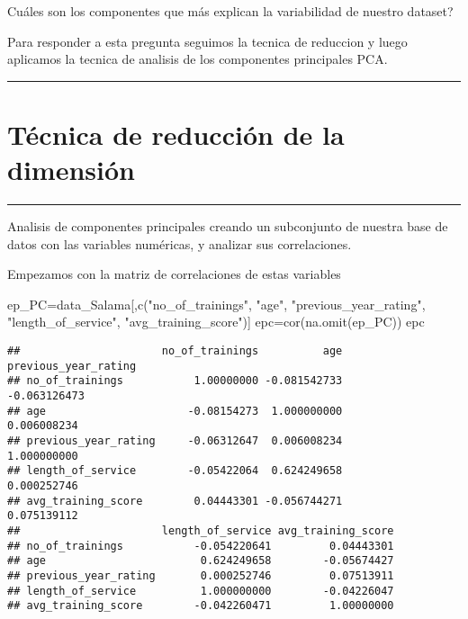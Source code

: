 \documentclass[
]{article}
\newenvironment{Shaded}{\begin{snugshade}}{\end{snugshade}}
\newcommand{\FunctionTok}[1]{\textcolor[rgb]{0.00,0.00,0.00}{#1}}
\newcommand{\NormalTok}[1]{#1}
\newcommand{\OtherTok}[1]{\textcolor[rgb]{0.56,0.35,0.01}{#1}}
\newcommand{\StringTok}[1]{\textcolor[rgb]{0.31,0.60,0.02}{#1}}
\begin{document}
Cuáles son los componentes que más explican la variabilidad de nuestro
dataset?

Para responder a esta pregunta seguimos la tecnica de reduccion y luego
aplicamos la tecnica de analisis de los componentes principales PCA.

\begin{center}\rule{0.5\linewidth}{0.5pt}\end{center}

\hypertarget{tuxe9cnica-de-reducciuxf3n-de-la-dimensiuxf3n}{%
\section{Técnica de reducción de la
dimensión}\label{tuxe9cnica-de-reducciuxf3n-de-la-dimensiuxf3n}}

\begin{center}\rule{0.5\linewidth}{0.5pt}\end{center}

Analisis de componentes principales creando un subconjunto de nuestra
base de datos con las variables numéricas, y analizar sus correlaciones.

Empezamos con la matriz de correlaciones de estas variables

\begin{Shaded}
\begin{Highlighting}[]
\NormalTok{ep\_PC}\OtherTok{=}\NormalTok{data\_Salama[,}\FunctionTok{c}\NormalTok{(}\StringTok{"no\_of\_trainings"}\NormalTok{, }\StringTok{"age"}\NormalTok{, }\StringTok{"previous\_year\_rating"}\NormalTok{, }\StringTok{"length\_of\_service"}\NormalTok{, }\StringTok{"avg\_training\_score"}\NormalTok{)]}
\NormalTok{epc}\OtherTok{=}\FunctionTok{cor}\NormalTok{(}\FunctionTok{na.omit}\NormalTok{(ep\_PC))}
\NormalTok{epc}
\end{Highlighting}
\end{Shaded}

\begin{verbatim}
##                      no_of_trainings          age previous_year_rating
## no_of_trainings           1.00000000 -0.081542733         -0.063126473
## age                      -0.08154273  1.000000000          0.006008234
## previous_year_rating     -0.06312647  0.006008234          1.000000000
## length_of_service        -0.05422064  0.624249658          0.000252746
## avg_training_score        0.04443301 -0.056744271          0.075139112
##                      length_of_service avg_training_score
## no_of_trainings           -0.054220641         0.04443301
## age                        0.624249658        -0.05674427
## previous_year_rating       0.000252746         0.07513911
## length_of_service          1.000000000        -0.04226047
## avg_training_score        -0.042260471         1.00000000
\end{verbatim}
\end{document}
